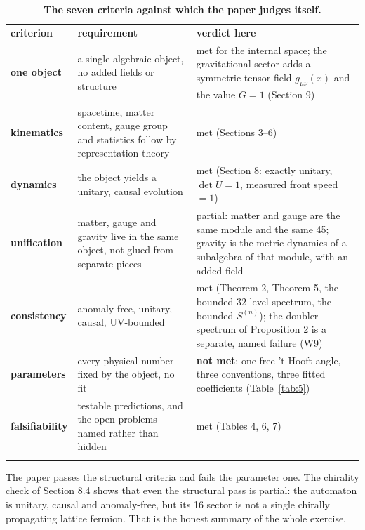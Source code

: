 \documentclass[aps,prd,twocolumn,amsmath,amssymb,superscriptaddress,nofootinbib,floatfix]{revtex4-2}
\newcommand{\grayhline}{\noalign{\vskip1pt{\color{black!30}\hrule height 0.3pt}\color{black}\vskip3pt}}
\begin{document}
\begin{table}[t]
\caption{\textbf{The seven criteria against which the paper judges itself.}}
\label{tabx1}
\footnotesize
\begin{tabular}{@{}p{}p{}p{}@{}}
\toprule
\textbf{criterion} & \textbf{requirement} & \textbf{verdict here} \\ \addlinespace[2pt] \midrule
\textbf{one object} & a single algebraic object, no added fields or structure & met for the internal space; the gravitational sector adds a symmetric
tensor field \(g_{\mu\nu}(x)\) and the value \(G = 1\) (Section 9) \\ \addlinespace[2pt]
\grayhline
\textbf{kinematics} & spacetime, matter content, gauge group and statistics follow by
representation theory & met (Sections 3--6) \\ \addlinespace[2pt]
\grayhline
\textbf{dynamics} & the object yields a unitary, causal evolution & met (Section 8: exactly unitary, \(\det U = 1\), measured front speed
\(= 1\)) \\ \addlinespace[2pt]
\grayhline
\textbf{unification} & matter, gauge and gravity live in the same object, not glued from
separate pieces & partial: matter and gauge are the same module and the same 45; gravity
is the metric dynamics of a subalgebra of that module, with an added
field \\ \addlinespace[2pt]
\grayhline
\textbf{consistency} & anomaly-free, unitary, causal, UV-bounded & met (Theorem 2, Theorem 5, the bounded 32-level spectrum, the bounded
\(S^{(n)}\)); the doubler spectrum of Proposition 2 is a separate, named
failure (W9) \\ \addlinespace[2pt]
\grayhline
\textbf{parameters} & every physical number fixed by the object, no fit & \textbf{not met}: one free 't Hooft angle, three conventions, three
fitted coefficients (Table~\ref{tab:5}) \\ \addlinespace[2pt]
\grayhline
\textbf{falsifiability} & testable predictions, and the open problems named rather than hidden & met (Tables 4, 6, 7) \\ \addlinespace[2pt] \bottomrule
\end{tabular}
\end{table}

The paper passes the structural criteria and fails the parameter one.
The chirality check of Section 8.4 shows that even the structural pass
is partial: the automaton is unitary, causal and anomaly-free, but its
16 sector is not a single chirally propagating lattice fermion. That is
the honest summary of the whole exercise.
\end{document}
